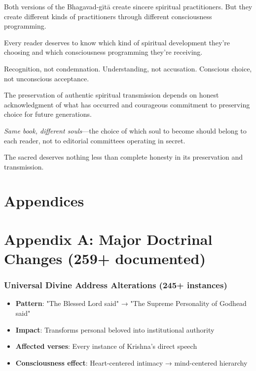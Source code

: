 \documentclass[11pt,twoside]{book}
\begin{document}
Both versions of the Bhagavad-gītā create sincere spiritual practitioners. But they create different kinds of practitioners through different consciousness programming.

Every reader deserves to know which kind of spiritual development they're choosing and which consciousness programming they're receiving.

Recognition, not condemnation. Understanding, not accusation. Conscious choice, not unconscious acceptance.

The preservation of authentic spiritual transmission depends on honest acknowledgment of what has occurred and courageous commitment to preserving choice for future generations.

\textit{Same book, different souls}—the choice of which soul to become should belong to each reader, not to editorial committees operating in secret.

The sacred deserves nothing less than complete honesty in its preservation and transmission.
\part*{Appendices}
\label{sec:org947a6b0}

\part*{Appendix A: Major Doctrinal Changes (259+ documented)}
\label{sec:orgc45d0cb}
\section*{Universal Divine Address Alterations (245+ instances)}
\label{sec:orgb59fe0c}
\begin{itemize}
\item \textbf{\textbf{Pattern}}: "The Blessed Lord said" → "The Supreme Personality of Godhead said"
\item \textbf{\textbf{Impact}}: Transforms personal beloved into institutional authority
\item \textbf{\textbf{Affected verses}}: Every instance of Krishna's direct speech
\item \textbf{\textbf{Consciousness effect}}: Heart-centered intimacy → mind-centered hierarchy
\end{itemize}
\end{document}
